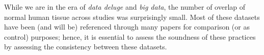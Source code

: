 While we are in the era of \emph{data deluge} and \emph{big data},
the number of overlap of normal human tissue across studies was surprisingly small.
Most of these datasets have been (and will be) referenced through
many papers for comparison (or as control) purposes;
hence, it is essential to assess the soundness of these practices by assessing
the consistency between these datasets.

